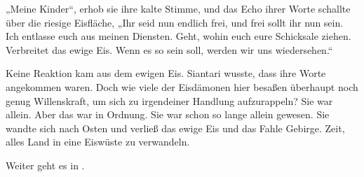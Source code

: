 „Meine Kinder“, erhob sie ihre kalte Stimme, und das Echo ihrer Worte schallte über die riesige Eisfläche, „Ihr seid nun endlich frei, und frei sollt ihr nun sein. Ich entlasse euch aus meinen Diensten. Geht, wohin euch eure Schicksale ziehen. Verbreitet das ewige Eis. Wenn es so sein soll, werden wir uns wiedersehen.“

Keine Reaktion kam aus dem ewigen Eis. Siantari wusste, dass ihre Worte angekommen waren. Doch wie viele der Eisdämonen hier besaßen überhaupt noch genug Willenskraft, um sich zu irgendeiner Handlung aufzurappeln? Sie war allein. Aber das war in Ordnung. Sie war schon so lange allein gewesen. Sie wandte sich nach Osten und verließ das ewige Eis und das Fahle Gebirge. Zeit, alles Land in eine Eiswüste zu verwandeln.

\begin{center}
    Weiter geht es in .
\end{center}






